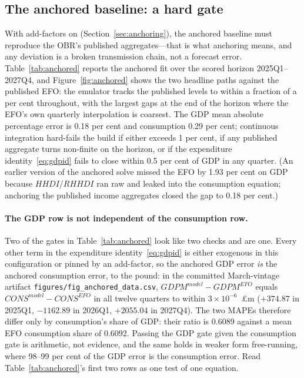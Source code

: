 \subsection{The anchored baseline: a hard gate}

With add-factors on (Section~\ref{sec:anchoring}), the anchored baseline must reproduce the OBR's published aggregates---that is what anchoring means, and any deviation is a broken transmission chain, not a forecast error. Table~\ref{tab:anchored} reports the anchored fit over the scored horizon 2025Q1--2027Q4, and Figure~\ref{fig:anchored} shows the two headline paths against the published EFO: the emulator tracks the published levels to within a fraction of a per cent throughout, with the largest gaps at the end of the horizon where the EFO's own quarterly interpolation is coarsest. The GDP mean absolute percentage error is 0.18 per cent and consumption 0.29 per cent; continuous integration hard-fails the build if either exceeds 1 per cent, if any published aggregate turns non-finite on the horizon, or if the expenditure identity~\eqref{eq:gdpid} fails to close within 0.5 per cent of GDP in any quarter. (An earlier version of the anchored solve missed the EFO by 1.93 per cent on GDP because $HHDI$/$RHHDI$ ran raw and leaked into the consumption equation; anchoring the published income aggregates closed the gap to 0.18 per cent.)

\paragraph{The GDP row is not independent of the consumption row.} Two of the gates in Table~\ref{tab:anchored} look like two checks and are one. Every other term in the expenditure identity~\eqref{eq:gdpid} is either exogenous in this configuration or pinned by an add-factor, so the anchored GDP error \emph{is} the anchored consumption error, to the pound: in the committed March-vintage artifact \texttt{figures/fig\_anchored\_data.csv}, $GDPM^{model}-GDPM^{EFO}$ equals $CONS^{model}-CONS^{EFO}$ in all twelve quarters to within $3\times10^{-6}$~\pounds m ($+374.87$ in 2025Q1, $-1162.89$ in 2026Q1, $+2055.04$ in 2027Q4). The two MAPEs therefore differ only by consumption's share of GDP: their ratio is 0.6089 against a mean EFO consumption share of 0.6092. Passing the GDP gate given the consumption gate is arithmetic, not evidence, and the same holds in weaker form free-running, where 98--99 per cent of the GDP error is the consumption error. Read Table~\ref{tab:anchored}'s first two rows as one test of one equation.

